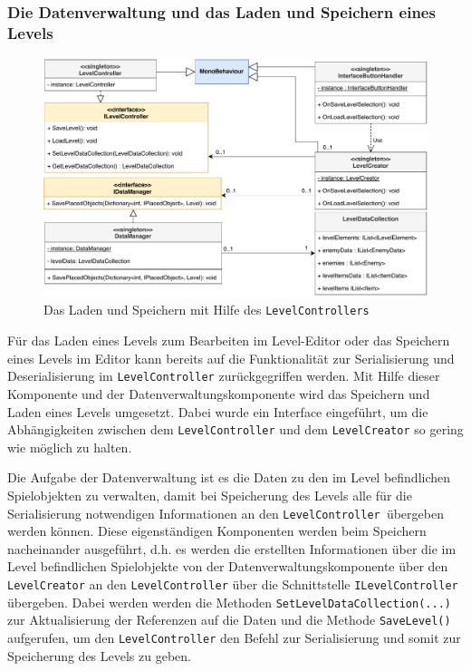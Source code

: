 \subsubsection{Die Datenverwaltung und das Laden und Speichern eines Levels}
\begin {figure}[h]
	\begin {center}
	    \includegraphics[width=1\textwidth]{pics/leveleditor_levelcontroller.pdf}
		\caption{Das Laden und Speichern mit Hilfe des \texttt{LevelControllers}}
		\label{fig:leveleditor_levelcontroller}
	\end {center}
\end {figure}

Für das Laden eines Levels zum Bearbeiten im Level-Editor oder das Speichern eines Levels im Editor kann bereits auf die Funktionalität zur Serialisierung und Deserialisierung im \texttt{LevelController} zurückgegriffen werden. Mit Hilfe dieser Komponente und der Datenverwaltungskomponente wird das Speichern und Laden eines Levels umgesetzt. Dabei wurde ein Interface eingeführt, um die Abhängigkeiten zwischen dem \texttt{LevelController} und dem \texttt{LevelCreator} so gering wie möglich zu halten.

Die Aufgabe der Datenverwaltung ist es die Daten zu den im Level befindlichen Spielobjekten zu verwalten, damit bei Speicherung des Levels alle für die Serialisierung notwendigen Informationen an den \texttt{LevelController }übergeben werden können. Diese eigenständigen Komponenten werden beim Speichern nacheinander ausgeführt, d.h. es werden die erstellten Informationen über die im Level befindlichen Spielobjekte von der Datenverwaltungskomponente über den \texttt{LevelCreator} an den \texttt{LevelController} über die Schnittstelle \texttt{ILevelController} übergeben. Dabei werden werden die Methoden \texttt{SetLevelDataCollection(...)} zur Aktualisierung der Referenzen auf die Daten und die Methode \texttt{SaveLevel()} aufgerufen, um den \texttt{LevelController} den Befehl zur Serialisierung und somit zur Speicherung des Levels zu geben. 

